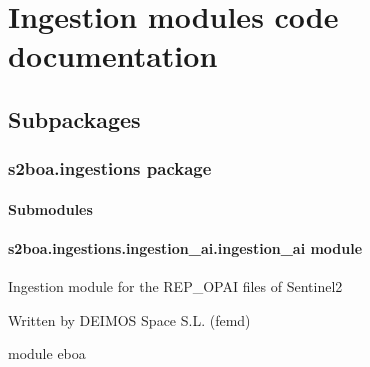 \chapter{Ingestion modules code documentation}
\section{Subpackages}
\label{\detokenize{s2boa:subpackages}}

\subsection{s2boa.ingestions package}
\label{\detokenize{s2boa.ingestions:s2boa-ingestions-package}}\label{\detokenize{s2boa.ingestions::doc}}

\subsubsection{Submodules}
\label{\detokenize{s2boa.ingestions:submodules}}

\subsubsection{s2boa.ingestions.ingestion\_ai.ingestion\_ai module}
\label{\detokenize{s2boa.ingestions:module-s2boa.ingestions.ingestion_ai.ingestion_ai}}\label{\detokenize{s2boa.ingestions:s2boa-ingestions-ingestion-ai-ingestion-ai-module}}
Ingestion module for the REP\_OPAI files of Sentinel\sphinxhyphen{}2

Written by DEIMOS Space S.L. (femd)

module eboa

